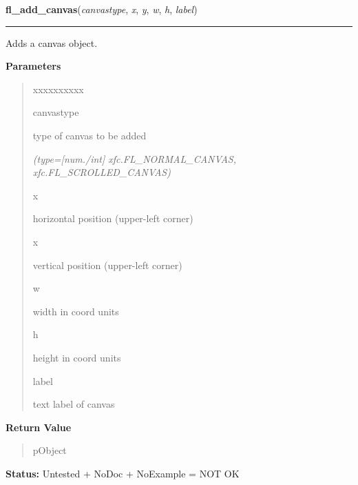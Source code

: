     \label{xformslib:library:fl_add_canvas}

    \vspace{0.5ex}

\hspace{.8\funcindent}\begin{boxedminipage}{\funcwidth}

    \raggedright \textbf{fl\_add\_canvas}(\textit{canvastype}, \textit{x}, \textit{y}, \textit{w}, \textit{h}, \textit{label})

    \vspace{-1.5ex}

    \rule{\textwidth}{0.5\fboxrule}
\setlength{\parskip}{2ex}
    Adds a canvas object.

\setlength{\parskip}{1ex}
      \textbf{Parameters}
      \vspace{-1ex}

      \begin{quote}
        \begin{Ventry}{xxxxxxxxxx}

          \item[canvastype]

          type of canvas to be added

            {\it (type=[num./int] xfc.FL\_NORMAL\_CANVAS, xfc.FL\_SCROLLED\_CANVAS)}

          \item[x]

          horizontal position (upper-left corner)

          \item[x]

          vertical position (upper-left corner)

          \item[w]

          width in coord units

          \item[h]

          height in coord units

          \item[label]

          text label of canvas

        \end{Ventry}

      \end{quote}

      \textbf{Return Value}
    \vspace{-1ex}

      \begin{quote}
      pObject

      \end{quote}

\textbf{Status:} Untested + NoDoc + NoExample = NOT OK



    \end{boxedminipage}

